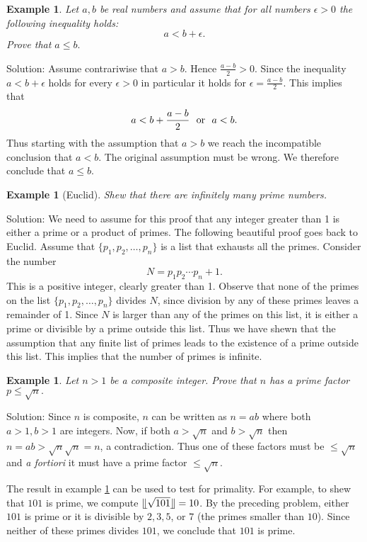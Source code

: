 \documentclass[11pt, openany]{book}
\theoremstyle{change} \theoremheaderfont{\blue\sffamily\bfseries}
\newtheorem{exa}[thm]{Example}
\theoremstyle{nonumberplain} \theoremheaderfont{\sffamily\bfseries}
\newcommand{\dis}{\displaystyle}
\newcommand{\í}{\'{\i}}
\begin{document}
\begin{exa}
Let $a, b$ be real numbers and assume that for all numbers
$\epsilon > 0$ the following inequality holds:
$$ a < b + \epsilon .$$ Prove that $a \leq b.$
\end{exa}
Solution: Assume contrariwise that $a > b.$ Hence $\dis{\frac{a -
b}{2} > 0}$. Since the inequality $a < b + \epsilon$ holds for
every $\epsilon > 0$ in particular it holds for $\dis{\epsilon =
\frac{a - b}{2}}$. This implies that
$$a < b + \frac{a - b}{2} \ \ {\rm or}  \ \  a < b.$$Thus starting with the assumption that
$a > b$ we reach the incompatible conclusion that $a < b.$ The
original assumption must be wrong. We therefore conclude that $a
\leq b.$
\begin{exa}[Euclid]
Shew that there are infinitely many prime numbers.
\label{exa:inf_primes}\end{exa} Solution:  We need to assume for
this proof that any integer greater than 1 is either a prime or a
product of primes. The following beautiful proof goes back to
Euclid.
\bigskip
    Assume that $\{p_1, p_2, \ldots , p_n\}$ is a list that exhausts all the primes. Consider the number
    $$N = p_1p_2\cdots p_n + 1.$$ This is a positive integer, clearly greater than 1. Observe that none of
    the primes on the list $\{p_1, p_2, \ldots , p_n\}$ divides $N$, since division by any of these primes
    leaves a remainder of 1. Since $N$ is larger than any of the primes on this list, it is either a prime
    or divisible by a prime outside this list. Thus we have shewn that the assumption that any finite list
    of primes leads to the existence of a prime outside this list. This implies that the number of primes
is infinite.
\begin{exa}
Let $n > 1$ be a composite integer. Prove that $n$ has a prime
factor $p \leq \sqrt{n}.$ \label{exa:root_primality}\end{exa}
Solution: Since $n$ is composite, $n$ can be written as $n = ab$
where both $a
> 1, b
> 1$ are integers. Now, if both $a > \sqrt{n}$ and $b > \sqrt{n}$
then $n = ab > \sqrt{n}\sqrt{n} = n$, a contradiction. Thus one of
these factors must be $\leq \sqrt{n}$ and {\em a fortiori} it must
have a prime factor $\leq \sqrt{n}$.


\bigskip

The result in example \ref{exa:root_primality} can be used to test
for primality. For example, to shew that $101$ is prime, we compute
$\llfloor \sqrt{101} \rrfloor = 10$. By the preceding problem,
either $101$ is prime or it is divisible by $2, 3, 5$, or $7$ (the
primes smaller than $10$). Since neither of these primes divides
$101$, we conclude that $101$ is prime.
\end{document}

